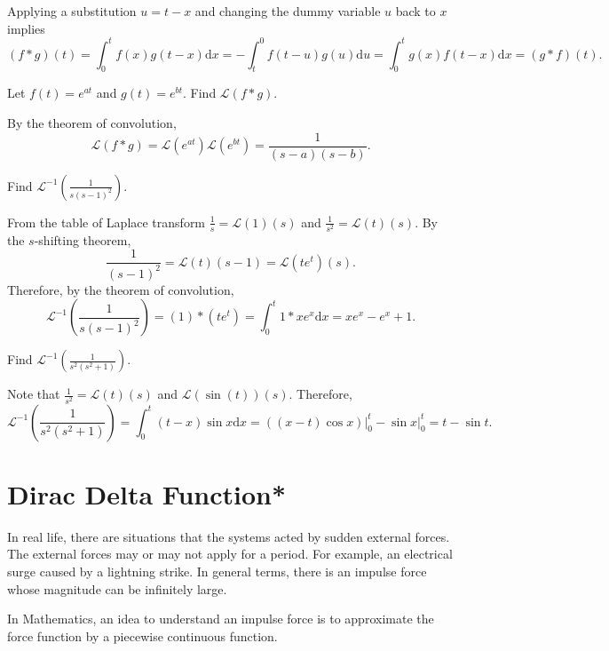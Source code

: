 Applying a substitution $u=t-x$ and changing the dummy variable $u$ back to $x$ implies
\[(f*g)(t)=\int_0^t f(x)g(t-x)\mathrm{d} x=-\int_t^0 f(t-u)g(u)\mathrm{d} u=\int_0^t g(x)f(t-x)\mathrm{d} x=(g*f)(t).\]

\begin{example}
Let $f(t)=e^{at}$ and $g(t)=e^{bt}$. Find $\mathcal{L}(f*g)$.
\end{example}
\begin{solution}
By the theorem of convolution,
\[\mathcal{L}(f*g)=\mathcal{L}(e^{at})\mathcal{ L}(e^{bt})=\frac{1}{(s-a)(s-b)}.\]
\end{solution}

\begin{example}
  Find $\mathcal{L}^{-1}\left(\frac{1}{s(s-1)^2}\right)$.
  \end{example}
  \begin{solution}
  From the table of Laplace transform $\frac1s=\mathcal{L}(1)(s)$ and $\frac{1}{s^2}=\mathcal{L}(t)(s)$. By the $s$-shifting theorem, 
  \[\frac{1}{(s-1)^2}=\mathcal{L}(t)(s-1)=\mathcal{L}(te^t)(s).\]
  Therefore, by the theorem of convolution,
  \[\mathcal{L}^{-1}\left(\frac{1}{s(s-1)^2}\right)=(1)*(te^t)=\int_0^t1*xe^x\mathrm{d} x=xe^x-e^x+1.\]
\end{solution}

\begin{exercise}
  Find $\mathcal{L}^{-1}\left(\frac{1}{s^2(s^2+1)}\right)$.
\end{exercise}
\begin{solution}
  Note that $\frac{1}{s^2}=\mathcal{L}(t)(s)$ and $\mathcal{L}(\sin(t))(s)$. Therefore,
  \[\mathcal{L}^{-1}\left(\frac{1}{s^2(s^2+1)}\right)=\int_0^t(t-x)\sin x\mathrm{d} x=((x-t)\cos x)\bigg|_0^t-\sin x\bigg|_0^t=t-\sin t.\]
\end{solution}

\section{Dirac Delta Function*}

In real life, there are situations that the systems acted by sudden external forces. The external forces may or may not apply for a period. For example, an electrical surge caused by a lightning strike. In general terms, there is an impulse force whose magnitude can be infinitely large.

In Mathematics, an idea to understand an impulse force is to approximate the force function by a piecewise continuous function.

